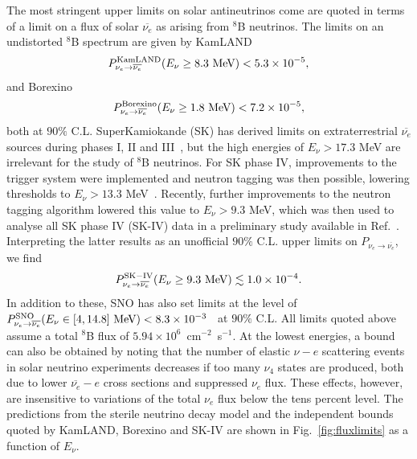 \documentclass[
reprint,
superscriptaddress,
showpacs,
preprintnumbers,
nofootinbib,
nobibnotes,
amsmath,
amssymb, 
aps,
prd,
floatfix
]{revtex4-1}
\newcommand{\reffig}[1]{Fig.~\ref{#1}}
\begin{document}
The most stringent upper limits on solar antineutrinos come are quoted in terms of a limit on a flux of solar $\overline{\nu_e}$ as arising from $^8$B neutrinos. The limits on an undistorted $^8$B spectrum are given by KamLAND~\cite{Collaboration:2011jza}
\begin{equation}
    P^{\rm KamLAND}_{\nu_e \to \overline{\nu_e}}(E_\nu \geq 8.3\,\, \text{MeV}) < 5.3 \times 10^{-5},
\end{equation}
and Borexino~\cite{Agostini:2019yuq}
\begin{equation}
    P^{\rm Borexino}_{\nu_e \to \overline{\nu_e}} (E_\nu\geq1.8\,\, \text{MeV}) < 7.2\times10^{-5},
\end{equation}
both at $90 \%$ C.L. SuperKamiokande (SK) has derived limits on extraterrestrial $\overline{\nu_e}$ sources during phases I, II and III~\cite{Bays:2011si}, but the high energies of $E_\nu > 17.3$ MeV are irrelevant for the study of $^8$B neutrinos. For SK phase IV, improvements to the trigger system were implemented and neutron tagging was then possible,  lowering thresholds to $E_\nu > 13.3$ MeV~\cite{Zhang:2013tua}. Recently, further improvements to the neutron tagging algorithm lowered this value to $E_\nu > 9.3$ MeV, which was then used to analyse all SK phase IV (SK-IV) data in a preliminary study available in Ref.~\cite{Linyan2018}. Interpreting the latter results as an unofficial $90\%$ C.L. upper limits on $P_{\nu_e \to \overline{\nu_e}}$, we find
\begin{equation}
    P^{\rm SK-IV}_{\nu_e \to \overline{\nu_e}} (E_\nu\geq9.3\,\, \text{MeV}) \lesssim 1.0\times10^{-4}.
\end{equation}
In addition to these, SNO has also set limits at the level of $P^{\rm SNO}_{\nu_e \to \overline{\nu_e}} (E_\nu \in [4,14.8]\,\, \text{MeV}) < 8.3\times10^{-3}$~\cite{Aharmim:2004uf} at $90\%$ C.L. All limits quoted above assume a total $^8$B flux of $5.94 \times 10^{6}$~cm$^{-2}$~s$^{-1}$. At the lowest energies, a bound can also be obtained by noting that the number of elastic $\nu - e $ scattering events in solar neutrino experiments decreases if too many $\nu_4$ states are produced, both due to lower $\overline{\nu_e}-e$ cross sections and suppressed $\nu_e$ flux. These effects, however, are insensitive to variations of the total $\nu_e$ flux below the tens percent level.
The predictions from the sterile neutrino decay model and the independent bounds quoted by KamLAND, Borexino and SK-IV are shown in \reffig{fig:fluxlimits} as a function of $E_\nu$.
\end{document}

